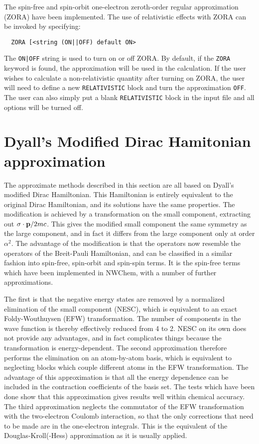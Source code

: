 The spin-free and spin-orbit one-electron zeroth-order regular approximation (ZORA) 
have been implemented. The use of relativistic effects with ZORA 
can be invoked by specifying:

\begin{verbatim}
  ZORA [<string (ON||OFF) default ON>
\end{verbatim}

The \verb+ON|OFF+ string is used to turn on or off ZORA.  
By default, if the \verb+ZORA+ keyword is found, the approximation 
will be used in the calculation. If the user wishes to calculate 
a non-relativistic quantity after turning on ZORA, the user 
will need to define a new \verb+RELATIVISTIC+ block and turn 
the approximation \verb+OFF+.  The user can also simply put 
a blank \verb+RELATIVISTIC+ block in the input file and all options 
will be turned off.

\section{Dyall's Modified Dirac Hamitonian approximation}
\label{sec:dyall-mod-dir}

The approximate methods described in this section are all based on Dyall's
modified Dirac Hamiltonian. This Hamiltonian is entirely equivalent to the
original Dirac Hamiltonian, and its solutions have the same properties.
The modification is achieved by a transformation on the small component,
extracting out \hbox{$\sigma\cdot{\bf p}/2mc$}. This gives the modified small
component the same symmetry as the large component, and in fact it differs
from the large component only at order $\alpha^2$.  The advantage of the
modification is that the operators now resemble the operators of the
Breit-Pauli Hamiltonian, and can be classified in a similar fashion into
spin-free, spin-orbit and spin-spin terms. It is the spin-free terms which
have been implemented in NWChem, with a number of further approximations.

The first is that the negative energy states are removed by a normalized
elimination of the small component (NESC), which is equivalent to an exact
Foldy-Wouthuysen (EFW) transformation. The number of components in the wave
function is thereby effectively reduced from 4 to 2. NESC on its own does
not provide any advantages, and in fact complicates things because the
transformation is energy-dependent. The second approximation therefore
performs the elimination on an atom-by-atom basis, which is equivalent to
neglecting blocks which couple different atoms in the EFW transformation.
The advantage of this approximation is that all the energy dependence can be
included in the contraction coefficients of the basis set.  The tests which
have been done show that this approximation gives results well within
chemical accuracy. The third approximation neglects the commutator of the
EFW transformation with the two-electron Coulomb interaction, so that the
only corrections that need to be made are in the one-electron integrals.
This is the equivalent of the Douglas-Kroll(-Hess) approximation as it is
usually applied.

